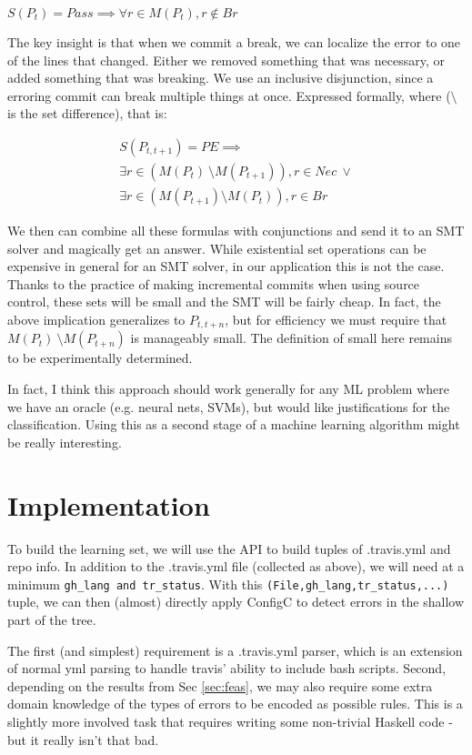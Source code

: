 \documentclass{sigplanconf}
\begin{document}
$S(P_t)=Pass \implies \forall r \in M(P_t), r \notin Br$

The key insight is that when we commit a break, we can localize the error to one of the lines that changed.
Either we removed something that was necessary, or added something that was breaking.
We use an inclusive disjunction, since a erroring commit can break multiple things at once.
Expressed formally, where ($\setminus$ is the set difference), that is:

\begin{align*}
  S(P_{t,t+1}) = PE \implies \\
  \exists r \in (M(P_{t})\ \setminus M(P_{t+1})), r \in Nec\ \lor \\
  \exists r \in (M(P_{t+1}) \setminus M(P_{t})), r \in Br
\end{align*}


We then can combine all these formulas with conjunctions and send it to an SMT solver and magically get an answer.
While existential set operations can be expensive in general for an SMT solver, in our application this is not the case.
Thanks to the practice of making incremental commits when using source control, these sets will be small and the SMT will be fairly cheap.
In fact, the above implication generalizes to $P_{t,t+n}$, but for efficiency we must require that $M(P_{t})\ \setminus M(P_{t+n})$ is manageably small.
The definition of small here remains to be experimentally determined.

In fact, I think this approach should work generally for any ML problem where we have an oracle (e.g. neural nets, SVMs), but would like justifications for the classification.
Using this as a second stage of a machine learning algorithm might be really interesting.

\section{Implementation}

To build the learning set, we will use the API to build tuples of .travis.yml and repo info.
In addition to the .travis.yml file (collected as above), we will need at a minimum \verb|gh_lang and tr_status|.
With this \verb|(File,gh_lang,tr_status,...)| tuple, we can then (almost) directly apply ConfigC to detect errors in the shallow part of the tree.

The first (and simplest) requirement is a .travis.yml parser, which is an extension of normal yml parsing to handle travis' ability to include bash scripts.
Second, depending on the results from Sec \ref{sec:feas}, we may also require some extra domain knowledge of the types of errors to be encoded as possible rules.
This is a slightly more involved task that requires writing some non-trivial Haskell code - but it really isn't that bad.






\end{document}

